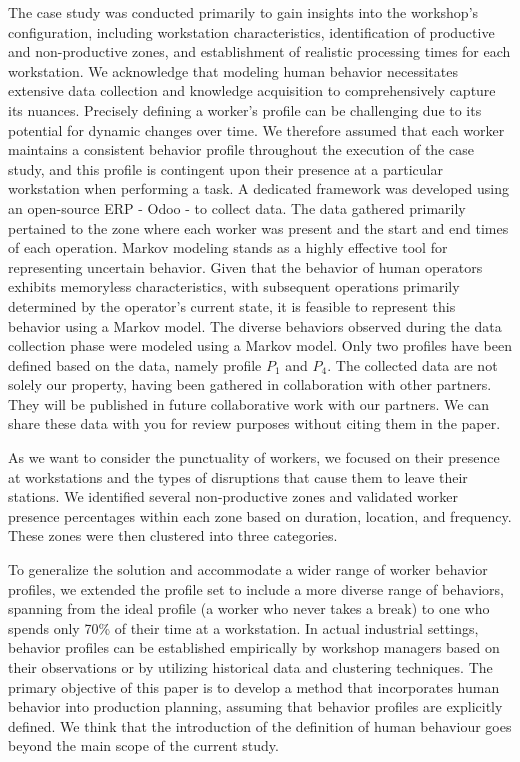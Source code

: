 \documentclass[preprint,11pt,3p]{elsarticle}
\begin{document}
\begin{tcolorbox}[colback=r_color1,colframe=r_color2,title=Response to Q13 :]
 The case study was conducted primarily to gain insights into the workshop's configuration, including workstation characteristics, identification of productive and non-productive zones, and establishment of realistic processing times for each workstation. We acknowledge that modeling human behavior necessitates extensive data collection and knowledge acquisition to comprehensively capture its nuances. Precisely defining a worker's profile can be challenging due to its potential for dynamic changes over time. We therefore assumed that each worker maintains a consistent behavior profile throughout the execution of the case study, and this profile is contingent upon their presence at a particular workstation when performing a task. A dedicated framework was developed using an open-source ERP - Odoo - to collect data. The data gathered primarily pertained to the zone where each worker was present and the start and end times of each operation. Markov modeling stands as a highly effective tool for representing uncertain behavior. Given that the behavior of human operators exhibits memoryless characteristics, with subsequent operations primarily determined by the operator's current state, it is feasible to represent this behavior using a Markov model. The diverse behaviors observed during the data collection phase were modeled using a Markov model. Only two profiles  have been defined based on the data, namely profile $P_1$ and $P_4$. The collected data are not solely our property, having been gathered in collaboration with other partners. They will be published in future collaborative work with our partners. We can share these data with you for review purposes without citing them in the paper.
 
As we want to consider the punctuality of workers, we focused on their presence at workstations and the types of disruptions that cause them to leave their stations. We identified several non-productive zones and validated worker presence percentages within each zone based on duration, location, and frequency. These zones were then clustered into three categories.

To generalize the solution and accommodate a wider range of worker behavior profiles, we extended the profile set to include a more diverse range of behaviors, spanning from the ideal profile (a worker who never takes a break) to one who spends only 70\% of their time at a workstation. In actual industrial settings, behavior profiles can be established empirically by workshop managers based on their observations or by utilizing historical data and clustering techniques. The primary objective of this paper is to develop a method that incorporates human behavior into production planning, assuming that behavior profiles are explicitly defined. We think that the introduction of the definition of human behaviour goes beyond the main scope of the current study.


\end{tcolorbox}
\end{document}
